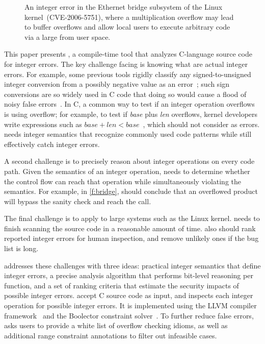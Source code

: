 \begin{figure}[t]
\centering

\vspace{-1em}
\caption{An integer error in the Ethernet bridge subsystem of the
Linux kernel~(CVE-2006-5751), where a multiplication overflow
may lead to buffer overflows and allow local users to execute
arbitrary code via a large  from user space.
}
\label{f:bridge}
\end{figure}

This paper presents \sys, a compile-time tool that analyzes C-language
source code for integer errors.
%
The key challenge facing \sys is knowing what are actual integer errors.  For
example, some previous tools rigidly classify any signed-to-unsigned integer
conversion from a possibly negative value as an error~\cite{brumley:rich,
  moy:z3prefix, seacord:secure-c}; such sign conversions are so widely used in C
code that doing so would cause a flood of noisy false
errors~\cite[\subsectionautorefname~6.2]{moy:z3prefix}.  In C, a common way to
test if an integer operation overflows is using overflow; for example, to test
if \textit{base} plus \textit{len} overflows, kernel developers write
expressions such as $\mathit{base} + \mathit{len} < \mathit{base}$~\cite{ioc},
which \sys should not consider as
errors.  \sys needs integer semantics that recognize commonly used code patterns
while still effectively catch integer errors.

A second challenge is to precisely reason about integer operations
on every code path.  Given the semantics of an integer operation,
\sys needs to determine whether the control flow can reach that
operation while simultaneously violating the semantics.  For
example, in \autoref{f:bridge}, \sys should conclude that an overflowed
product  will bypass the sanity check and reach the
 call.

The final challenge is to apply \sys to large systems such as the
Linux kernel.  \sys needs to finish scanning the source code in a
reasonable amount of time.  \sys also should rank reported integer
errors for human inspection, and remove unlikely ones if the bug
list is long.

\sys addresses these challenges with three ideas: practical integer
semantics that define integer errors, a precise analysis algorithm
that performs bit-level reasoning per function, and a set of ranking
criteria that estimate the security impacts of possible integer
errors.  \sys accept C source code as input, and inspects each
integer operation for possible integer errors.
%
It is implemented using the LLVM compiler framework~\cite{lattner:llvm}
and the Boolector constraint solver~\cite{boolector}.
%
To further reduce false errors, \sys asks users to provide a white
list of overflow checking idioms, as well as additional range
constraint annotations to filter out infeasible cases.

